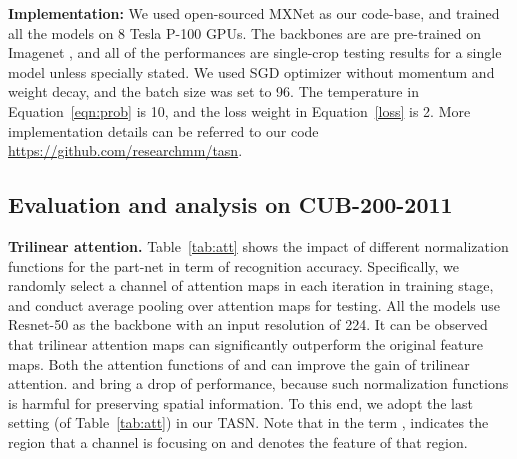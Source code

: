 \documentclass[10pt,twocolumn,letterpaper]{article}
\begin{document}
\begin{table}
{\small
\caption{Ablation experiments on attention module in terms of recognition accuracy on the CUB-200-2011 dataset.}
\label{tab:att}
\begin{center}
\end{center}
}
 \vspace{-7 mm}
\end{table}


\textbf{Implementation:} We used open-sourced MXNet \cite{chen2015mxnet} as our code-base, and trained all the models on 8 Tesla P-100 GPUs. The backbones are are pre-trained on Imagenet \cite{ILSVRC15}, and all of the performances are single-crop testing results for a single model unless specially stated. We used SGD optimizer without momentum and weight decay, and the batch size was set to 96. The temperature in Equation~\ref{eqn:prob} is 10, and the loss weight  in Equation~\ref{loss} is 2. More implementation details can be referred to our code \url{https://github.com/researchmm/tasn}.
\label{details}



\subsection{Evaluation and analysis on CUB-200-2011}
\label{exp:CUB}

\textbf{Trilinear attention.}
\label{sec:exp_trilinear}
Table~\ref{tab:att} shows the impact of different normalization functions for the part-net in term of recognition accuracy. Specifically, we randomly select a channel of attention maps in each iteration in training stage, and conduct average pooling over attention maps for testing. All the models use Resnet-50 as the backbone with an input resolution of 224. It can be observed that trilinear attention maps can significantly outperform the original feature maps. Both the attention functions of  and  can improve the gain of trilinear attention.  and  bring a drop of performance, because such normalization functions is harmful for preserving spatial information. To this end, we adopt the last setting (of Table~\ref{tab:att}) in our TASN. Note that in the term ,  indicates the region that a channel is focusing on and  denotes the feature of that region.
\end{document}
